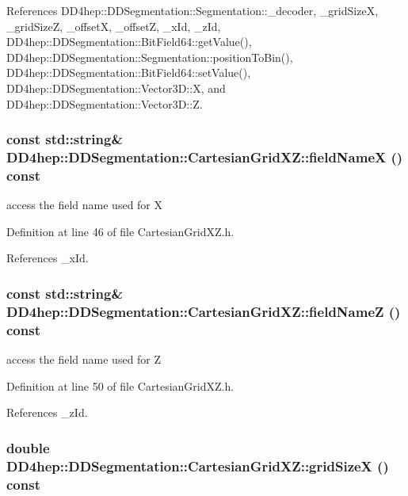 References DD4hep::DDSegmentation::Segmentation::\_\-decoder, \_\-gridSizeX, \_\-gridSizeZ, \_\-offsetX, \_\-offsetZ, \_\-xId, \_\-zId, DD4hep::DDSegmentation::BitField64::getValue(), DD4hep::DDSegmentation::Segmentation::positionToBin(), DD4hep::DDSegmentation::BitField64::setValue(), DD4hep::DDSegmentation::Vector3D::X, and DD4hep::DDSegmentation::Vector3D::Z.\hypertarget{class_d_d4hep_1_1_d_d_segmentation_1_1_cartesian_grid_x_z_a80a5d5e1b6b9fb57b02883e84eec88cf}{
\subsubsection[{fieldNameX}]{\setlength{\rightskip}{0pt plus 5cm}const std::string\& DD4hep::DDSegmentation::CartesianGridXZ::fieldNameX () const}}
\label{class_d_d4hep_1_1_d_d_segmentation_1_1_cartesian_grid_x_z_a80a5d5e1b6b9fb57b02883e84eec88cf}


access the field name used for X 

Definition at line 46 of file CartesianGridXZ.h.

References \_\-xId.\hypertarget{class_d_d4hep_1_1_d_d_segmentation_1_1_cartesian_grid_x_z_a632e941a62b52d78235198d042f43802}{
\subsubsection[{fieldNameZ}]{\setlength{\rightskip}{0pt plus 5cm}const std::string\& DD4hep::DDSegmentation::CartesianGridXZ::fieldNameZ () const}}
\label{class_d_d4hep_1_1_d_d_segmentation_1_1_cartesian_grid_x_z_a632e941a62b52d78235198d042f43802}


access the field name used for Z 

Definition at line 50 of file CartesianGridXZ.h.

References \_\-zId.\hypertarget{class_d_d4hep_1_1_d_d_segmentation_1_1_cartesian_grid_x_z_a8177655fb094b8874faf15c754057f92}{
\subsubsection[{gridSizeX}]{\setlength{\rightskip}{0pt plus 5cm}double DD4hep::DDSegmentation::CartesianGridXZ::gridSizeX () const}}
\label{class_d_d4hep_1_1_d_d_segmentation_1_1_cartesian_grid_x_z_a8177655fb094b8874faf15c754057f92}



